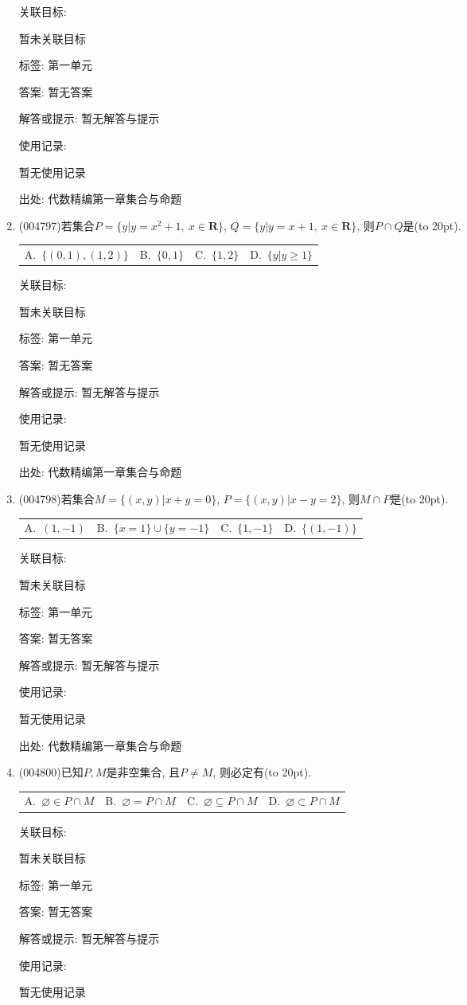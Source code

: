 \documentclass[10pt,a4paper]{article}
\newcommand{\bracket}[1]{(\hbox to #1pt{})}
\newcommand{\fourch}[4]{\par\begin{tabular}{p{.23\textwidth}p{.23\textwidth}p{.23\textwidth}p{.23\textwidth}}
A.~#1 &B.~#2& C.~#3& D.~#4
\end{tabular}}
\begin{document}
\begin{enumerate}[1.]
关联目标:

暂未关联目标



标签: 第一单元

答案: 暂无答案

解答或提示: 暂无解答与提示

使用记录:

暂无使用记录


出处: 代数精编第一章集合与命题
\item { (004797)}若集合$P=\{y|y =x^2+1,\ x\in \mathbf{R}\}$, $Q=\{y|y=x+1, \ x\in \mathbf{R}\}$, 则$P\cap Q$是\bracket{20}.
\fourch{$\{(0,1),(1,2)\}$}{$\{0,1\}$}{$\{1,2\}$}{$\{y|y \ge 1\}$}


关联目标:

暂未关联目标



标签: 第一单元

答案: 暂无答案

解答或提示: 暂无解答与提示

使用记录:

暂无使用记录


出处: 代数精编第一章集合与命题
\item { (004798)}若集合$M=\{(x,y)|x+y=0\}$, $P=\{(x,y)|x-y=2\}$, 则$M\cap P$是\bracket{20}.
\fourch{$(1,-1)$}{$\{x=1\}\cup \{y=-1\}$}{$\{1,-1\}$}{$\{(1,-1)\}$}


关联目标:

暂未关联目标



标签: 第一单元

答案: 暂无答案

解答或提示: 暂无解答与提示

使用记录:

暂无使用记录


出处: 代数精编第一章集合与命题
\item { (004800)}已知$P,M$是非空集合, 且$P\ne M$, 则必定有\bracket{20}.
\fourch{$\varnothing \in P\cap M$}{$\varnothing=P\cap M$}{$\varnothing \subseteq P\cap M$}{$\varnothing \subset P\cap M$}


关联目标:

暂未关联目标



标签: 第一单元

答案: 暂无答案

解答或提示: 暂无解答与提示

使用记录:

暂无使用记录



\end{enumerate}
\end{document}
